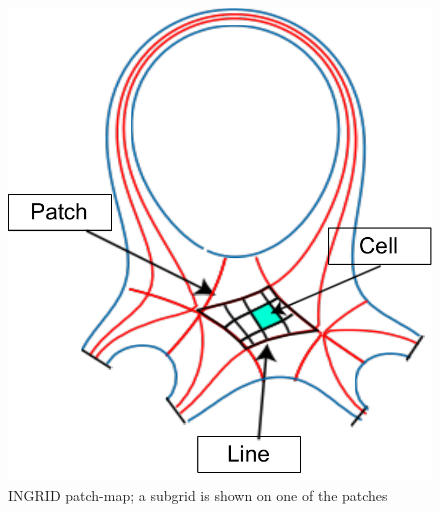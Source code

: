 





\begin{figure}[H]
    \centering
    \includegraphics[width=0.35\linewidth]{figures/geometry_render.pdf}  %
    \caption{INGRID patch-map; a subgrid is shown on one of the patches}
    \label{fig:patchmap_subgrid}
\end{figure}

